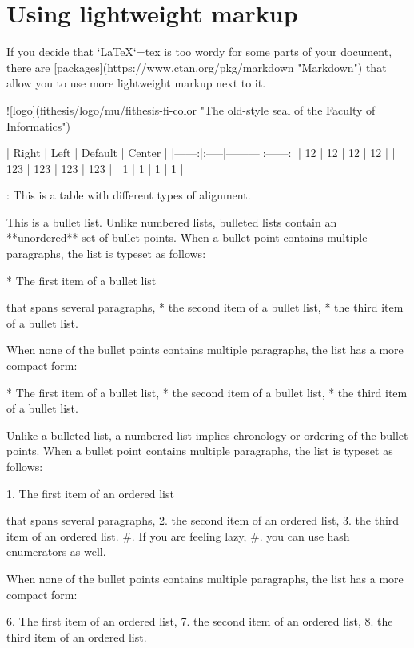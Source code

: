 \documentclass[
  digital,     %
  oneside,     %
  nosansbold,  %
  nocolorbold, %
  lof,         %
  lot,         %
]{fithesis4}
\begin{document}
\chapter{Using lightweight markup}
\shorthandoff{-}
\begin{markdown}

If you decide that `\LaTeX`{=tex} is too wordy for some parts of your
document, there are [packages](https://www.ctan.org/pkg/markdown
"Markdown") that allow you to use more lightweight markup next
to it.

 ![logo](fithesis/logo/mu/fithesis-fi-color "The old-style seal of
         the Faculty of Informatics")

| Right | Left | Default | Center |
|------:|:-----|---------|:------:|
|    12 | 12   | 12      |   12   |
|   123 | 123  | 123     |   123  |
|     1 | 1    | 1       |    1   |

: This is a table with different types of alignment.

This is a bullet list. Unlike numbered lists, bulleted lists
contain an **unordered** set of bullet points. When a bullet point
contains multiple paragraphs, the list is typeset as follows:

  * The first item of a bullet list

    that spans several paragraphs,
  * the second item of a bullet list,
  * the third item of a bullet list.

When none of the bullet points contains multiple paragraphs, the
list has a more compact form:

  * The first item of a bullet list,
  * the second item of a bullet list,
  * the third item of a bullet list.

Unlike a bulleted list, a numbered list implies chronology or
ordering of the bullet points. When a bullet point
contains multiple paragraphs, the list is typeset as follows:

  1. The first item of an ordered list

     that spans several paragraphs,
  2. the second item of an ordered list,
  3. the third item of an ordered list.
  #. If you are feeling lazy,
  #. you can use hash enumerators as well.

When none of the bullet points contains multiple paragraphs, the
list has a more compact form:

  6. The first item of an ordered list,
  7. the second item of an ordered list,
  8. the third item of an ordered list.


\end{markdown}
\end{document}
